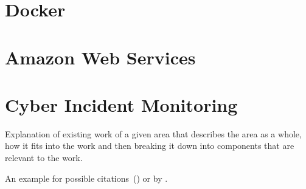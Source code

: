\section{Docker}
\section{Amazon Web Services}

\section{Cyber Incident Monitoring}

Explanation of existing work of a given area that describes the area as a whole, how it fits into the work and then breaking it down into components that are relevant to the work.

An example for possible citations~(\cite{Andrew2013empirical}) or by \cite{Asghari2015Economics}.


